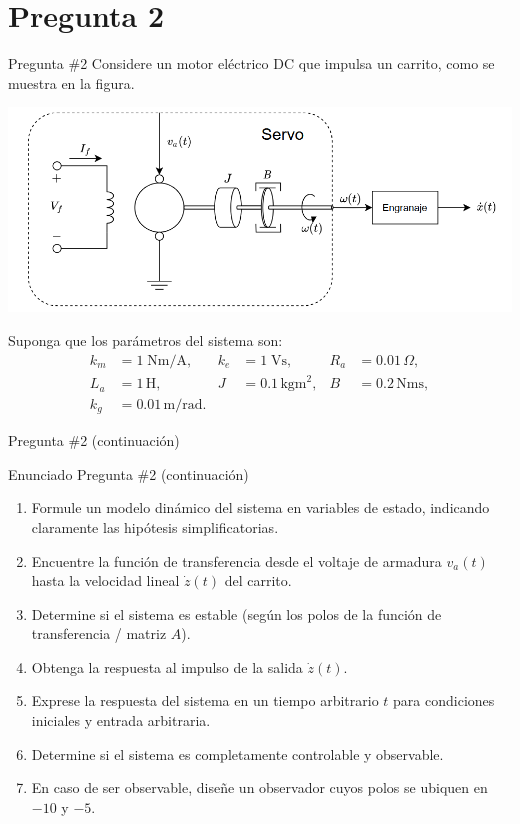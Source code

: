 \documentclass[
    10pt,
    aspectratio=169,
    xcolor={dvipsnames},
    spanish,
    ]{beamer}
\begin{document}
\section{Pregunta 2}
\begin{frame}{Pregunta \#2}
\footnotesize
Considere un motor eléctrico DC que impulsa un carrito, como se muestra en la figura.
  \begin{center}
    \includegraphics[width=.65\textwidth]{Figura_6.png}
  \end{center}
  Suponga que los parámetros del sistema son:
  \begin{align}
     k_m &= 1\;\text{Nm/A}, & k_e &= 1\;\text{Vs}, & R_a &= 0.01\,\Omega, \\
     L_a &= 1\,\text{H}, & J &= 0.1\,\text{kgm}^2, & B &= 0.2\,\text{Nms}, \\
     k_g &= 0.01\,\text{m/rad}. & &
  \end{align}
\end{frame}
\begin{frame}{Pregunta \#2 (continuación)}
  \begin{block}{Enunciado Pregunta \#2 (continuación)}
  \begin{enumerate}
    \item Formule un modelo dinámico del sistema en variables de estado, indicando claramente las hipótesis simplificatorias.
    \item Encuentre la función de transferencia desde el voltaje de armadura $v_a(t)$ hasta la velocidad lineal $\dot z(t)$ del carrito.
    \item Determine si el sistema es estable (según los polos de la función de transferencia / matriz $A$).
    \item Obtenga la respuesta al impulso de la salida $\dot z(t)$.
    \item Exprese la respuesta del sistema en un tiempo arbitrario $t$ para condiciones iniciales y entrada arbitraria.
    \item Determine si el sistema es completamente controlable y observable.
    \item En caso de ser observable, diseñe un observador cuyos polos se ubiquen en $-10$ y $-5$.
  \end{enumerate}
\end{block}
\end{frame}

\end{document}
